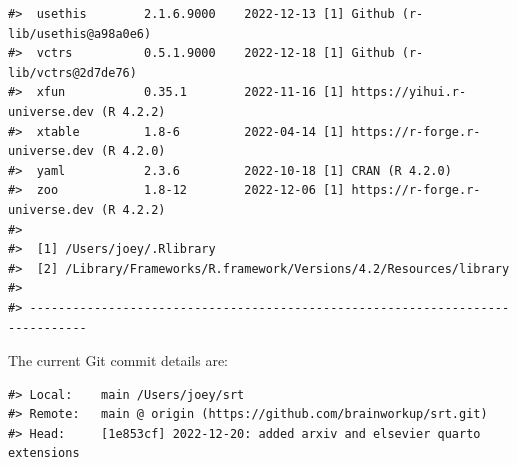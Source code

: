 \documentclass[
  number]{elsarticle}
\begin{document}
\begin{verbatim}
#>  usethis        2.1.6.9000    2022-12-13 [1] Github (r-lib/usethis@a98a0e6)
#>  vctrs          0.5.1.9000    2022-12-18 [1] Github (r-lib/vctrs@2d7de76)
#>  xfun           0.35.1        2022-11-16 [1] https://yihui.r-universe.dev (R 4.2.2)
#>  xtable         1.8-6         2022-04-14 [1] https://r-forge.r-universe.dev (R 4.2.0)
#>  yaml           2.3.6         2022-10-18 [1] CRAN (R 4.2.0)
#>  zoo            1.8-12        2022-12-06 [1] https://r-forge.r-universe.dev (R 4.2.2)
#> 
#>  [1] /Users/joey/.Rlibrary
#>  [2] /Library/Frameworks/R.framework/Versions/4.2/Resources/library
#> 
#> ------------------------------------------------------------------------------
\end{verbatim}

The current Git commit details are:

\begin{verbatim}
#> Local:    main /Users/joey/srt
#> Remote:   main @ origin (https://github.com/brainworkup/srt.git)
#> Head:     [1e853cf] 2022-12-20: added arxiv and elsevier quarto extensions
\end{verbatim}


  
\end{document}
